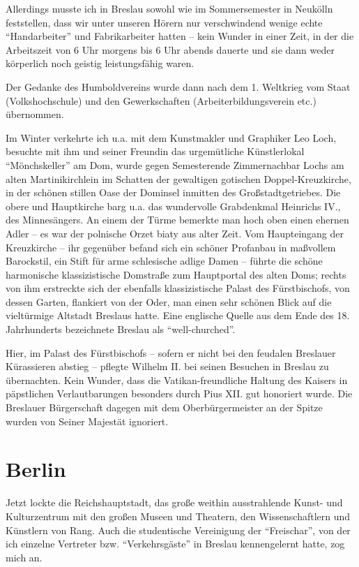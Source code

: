 Allerdings musste ich in Breslau sowohl wie im Sommersemester in Neukölln feststellen, dass wir unter unseren Hörern nur verschwindend wenige echte \enquote{Handarbeiter} und Fabrikarbeiter hatten -- kein Wunder in einer Zeit, in der die Arbeitszeit von 6 Uhr morgens bis 6 Uhr abends dauerte und sie dann weder körperlich noch geistig leistungsfähig waren.

Der Gedanke des Humboldvereins wurde dann nach dem 1. Weltkrieg vom Staat (Volkshochschule) und den Gewerkschaften (Arbeiterbildungsverein etc.) übernommen.

Im Winter verkehrte ich u.a. mit dem Kunstmakler und Graphiker Leo Loch, besuchte mit ihm und seiner Freundin das urgemütliche Künstlerlokal \enquote{Mönchskeller} am Dom, wurde gegen Semesterende Zimmernachbar Lochs am alten Martinikirchlein im Schatten der gewaltigen gotischen Doppel\--Kreuz\-kirche, in der schönen stillen Oase der Dominsel inmitten des Großstadtgetriebes. Die obere und Hauptkirche barg u.a. das wundervolle Grabdenkmal Heinrichs IV., des Minnesängers. An einem der Türme bemerkte man hoch oben einen ehernen Adler -- es war der polnische Orzet biaty aus alter Zeit. Vom Haupteingang der Kreuzkirche -- ihr gegenüber befand sich ein schöner Profanbau in maßvollem Barockstil, ein Stift für arme schlesische adlige Damen -- führte die schöne harmonische klassizistische Domstraße zum Hauptportal des alten Doms; rechts von ihm erstreckte sich der ebenfalls klassizistische Palast des Fürstbischofs, von dessen Garten, flankiert von der Oder, man einen sehr schönen Blick auf die vieltürmige Altstadt Breslaus hatte. Eine englische Quelle aus dem Ende des 18. Jahrhunderts bezeichnete Breslau als \enquote{well-churched}.

Hier, im Palast des Fürstbischofs -- sofern er nicht bei den feudalen Breslauer Kürassieren abstieg -- pflegte Wilhelm II. bei seinen Besuchen in Breslau zu übernachten. Kein Wunder, dass die Vatikan-freundliche Haltung des Kaisers in päpstlichen Verlautbarungen besonders durch Pius XII. gut honoriert wurde. Die Breslauer Bürgerschaft dagegen mit dem Oberbürgermeister an der Spitze wurden von Seiner Majestät ignoriert.


\section{Berlin}

Jetzt lockte die Reichshauptstadt, das große weithin ausstrahlende Kunst- und Kulturzentrum mit den großen Museen und Theatern, den Wissenschaftlern und Künstlern von Rang. Auch die studentische Vereinigung der \enquote{Freischar}, von der ich einzelne Vertreter bzw. \enquote{Verkehrsgäste} in Breslau kennengelernt hatte, zog mich an.

